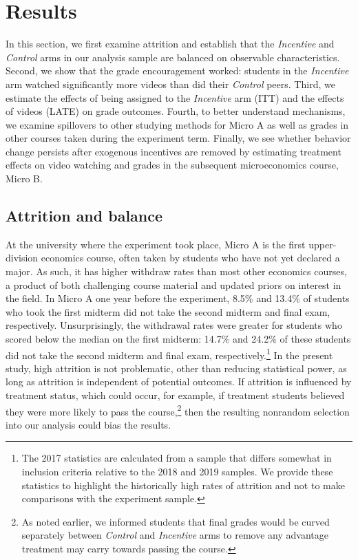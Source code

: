 \documentclass[12pt]{article}
\begin{document}



\section{Results} \label{results}

In this section, we first examine attrition and establish that the \textit{Incentive} and \textit{Control} arms in our analysis sample are balanced on observable characteristics. Second, we show that the grade encouragement worked: students in the \textit{Incentive} arm watched significantly more videos than did their \textit{Control} peers. Third, we estimate the effects of being assigned to the \textit{Incentive} arm (ITT) and the effects of videos (LATE) on grade outcomes. Fourth, to better understand mechanisms, we examine spillovers to other studying methods for Micro A as well as grades in other courses taken during the experiment term. Finally, we see whether behavior change persists after exogenous incentives are removed by estimating treatment effects on video watching and grades in the subsequent microeconomics course, Micro B.

\subsection{Attrition and balance} \label{attrition}

At the university where the experiment took place, Micro A is the first upper-division economics course, often taken by students who have not yet declared a major. As such, it has higher withdraw rates than most other economics courses, a product of both challenging course material and updated priors on interest in the field. In Micro A one year before the experiment, 8.5\% and 13.4\% of students who took the first midterm did not take the second midterm and final exam, respectively. Unsurprisingly, the withdrawal rates were greater for students who scored below the median on the first midterm: 14.7\% and 24.2\% of these students did not take the second midterm and final exam, respectively.\footnote{The 2017 statistics are calculated from a sample that differs somewhat in inclusion criteria relative to the 2018 and 2019 samples. We provide these statistics to highlight the historically high rates of attrition and not to make comparisons with the experiment sample.} In the present study, high attrition is not problematic, other than reducing statistical power, as long as attrition is independent of potential outcomes. If attrition is influenced by treatment status, which could occur, for example, if treatment students believed they were more likely to pass the course,\footnote{As noted earlier, we informed students that final grades would be curved separately between \textit{Control} and \textit{Incentive} arms to remove any advantage treatment may carry towards passing the course.} then the resulting nonrandom selection into our analysis could bias the results.
\end{document}
